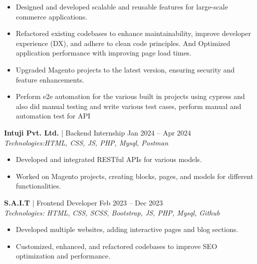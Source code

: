 \documentclass[a4paper,10pt]{article}
\begin{document}
\begin{itemize}
    \item Designed and developed scalable and reusable features for large-scale commerce applications.
    \item Refactored existing codebases to enhance maintainability, improve developer experience (DX), and adhere to clean code principles. And Optimized application performance with improving page load times.
    \item Upgraded Magento projects to the latest version, ensuring security and feature enhancements.
    \item Perform e2e automation for the various built in projects using cypress and also did manual testing and write various test cases, perform manual and automation test for API



\end{itemize}

\noindent\textbf{Intuji Pvt. Ltd.} | Backend Internship \hfill Jan 2024 -- Apr 2024 \\
\textit{Technologies:HTML, CSS, JS, PHP, Mysql, Postman }

\begin{itemize}
    \item Developed and integrated RESTful APIs for various models. 
    \item Worked on Magento projects, creating blocks, pages, and models for different functionalities.
\end{itemize}

\noindent\textbf{S.A.I.T} | Frontend Developer \hfill Feb 2023 -- Dec 2023 \\
\textit{Technologies: HTML, CSS, SCSS, Bootstrap, JS, PHP, Mysql, Github}

\begin{itemize}
    \item Developed multiple websites, adding interactive pages and blog sections.
    \item  Customized, enhanced, and refactored codebases to improve SEO optimization and performance.

\end{itemize}


\end{document}
